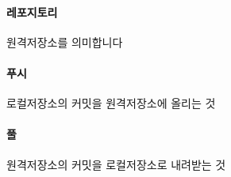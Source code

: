 \documentclass[12pt, a4paper, oneside]{book}
\begin{document}
		\paragraph{레포지토리} 원격저장소를 의미합니다 
		\paragraph{푸시} 로컬저장소의 커밋을 원격저장소에 올리는 것
		\paragraph{풀} 원격저장소의 커밋을 로컬저장소로 내려받는 것









\end{document}
